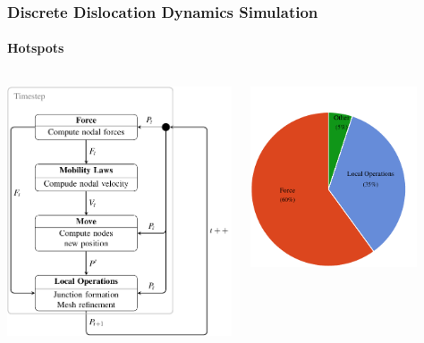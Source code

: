 \documentclass[aspectratio=1610,t,10pt]{beamer}
\newlength{\freeheight}
\begin{document}
\begin{frame}
	\frametitle{Discrete Dislocation Dynamics Simulation}
	\framesubtitle{Hotspots}
	
	\begin{columns}[c]
		\begin{column}{.45\textwidth}
			\includegraphics[height=\freeheight]{img/simulation-steps.pdf}
		\end{column}
		\begin{column}{.45\textwidth}
			\centering
			\includegraphics[width=0.8\textwidth]{img/hotspots.pdf}
		\end{column}
	\end{columns}
	
\end{frame}
\end{document}
